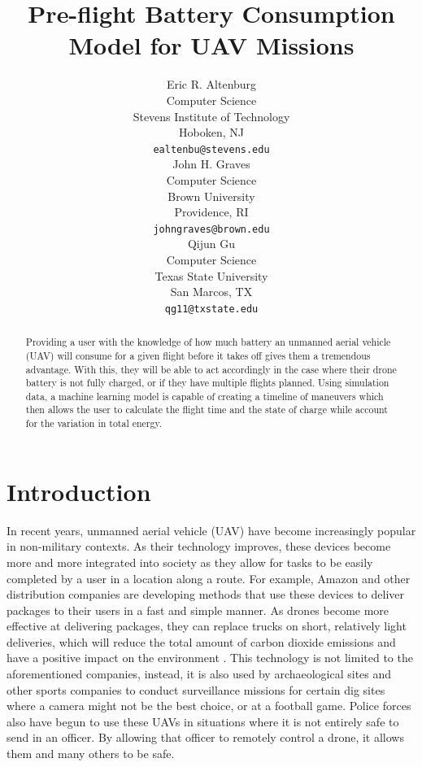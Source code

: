 \documentclass{article}
\title{Pre-flight Battery Consumption Model for UAV Missions}
\author{
Eric R. Altenburg\\
Computer Science\\
Stevens Institute of Technology\\
Hoboken, NJ \\
\texttt{ealtenbu@stevens.edu}\\
\And
John H. Graves\\
Computer Science\\
Brown University\\
Providence, RI \\
\texttt{john\textunderscore graves@brown.edu} \\
\And
Qijun Gu\\
Computer Science\\
Texas State University\\
San Marcos, TX \\
\texttt{qg11@txstate.edu}\\
}
\begin{document}
\maketitle


\begin{abstract}
Providing a user with the knowledge of how much battery an unmanned aerial vehicle (UAV) will consume for a given flight before it takes off gives them a tremendous advantage. With this, they will be able to act accordingly in the case where their drone battery is not fully charged, or if they have multiple flights planned. Using simulation data, a machine learning model is capable of creating a timeline of maneuvers which then allows the user to calculate the flight time and the state of charge while account for the variation in total energy.
\end{abstract}




\section{Introduction}
In recent years, unmanned aerial vehicle (UAV) have become increasingly popular in non-military contexts. As their technology improves, these devices become more and more integrated into society as they allow for tasks to be easily completed by a user in a location along a route. For example, Amazon and other distribution companies are developing methods that use these devices to deliver packages to their users in a fast and simple manner. As drones become more effective at delivering packages, they can replace trucks on short, relatively light deliveries, which will reduce the total amount of carbon dioxide emissions and have a positive impact on the environment \cite{Goodchild}. This technology is not limited to the aforementioned companies, instead, it is also used by archaeological sites and other sports companies to conduct surveillance missions for certain dig sites where a camera might not be the best choice, or at a football game. Police forces also have begun to use these UAVs in situations where it is not entirely safe to send in an officer. By allowing that officer to remotely control a drone, it allows them and many others to be safe.\par
\end{document}
